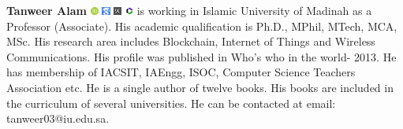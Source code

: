 \documentclass{iaesarticle}
\begin{document}
\vspace{.7em}

\begin{biography}
\textbf{Tanweer Alam} %
\href{https://orcid.org/0000-0003-2731-4627}{\includegraphics[width=0.02\textwidth]{orcid.png}} 
\href{https://scholar.google.com/citations?user=MUQy5QUAAAAJ&hl=id&oi=ao}{\includegraphics[width=0.02\textwidth]{gscholar.png}}
\href{https://www.scopus.com/authid/detail.uri?authorId=57189067051}{\includegraphics[width=0.02\textwidth]{scopus.png}}
\href{https://www.webofscience.com/wos/author/rid/M-7780-2017/}{\includegraphics[width=0.02\textwidth]{wos.png}} is working in Islamic University of Madinah as a Professor (Associate). His academic qualification is Ph.D., MPhil, MTech, MCA, MSc. His research area includes Blockchain, Internet of Things and Wireless Communications. His profile was published in Who’s who in the world- 2013. He has membership of IACSIT, IAEngg, ISOC, Computer Science Teachers Association etc. He is a single author of twelve books. His books are included in the curriculum of several universities. He can be contacted at email: tanweer03@iu.edu.sa.
\end{biography}

\vspace{.7em}
\end{document}
